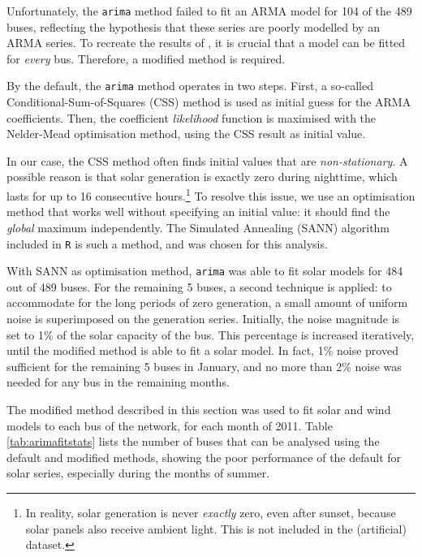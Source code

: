 \documentclass[main.tex]{subfiles}
\begin{document}
Unfortunately, the \texttt{arima} method failed to fit an ARMA model for 104 of the 489 buses, reflecting the hypothesis that these series are poorly modelled by an ARMA series. To recreate the results of \cite{Nesti2018emergentfailures}, it is crucial that a model can be fitted for \emph{every} bus. Therefore, a modified method is required.

By the default, the \texttt{arima} method operates in two steps. First, a so-called Conditional-Sum-of-Squares (CSS) method is used as initial guess for the ARMA coefficients. Then, the coefficient \emph{likelihood} function is maximised with the Nelder-Mead optimisation method, using the CSS result as initial value. 

In our case, the CSS method often finds initial values that are \emph{non-stationary}. A possible reason is that solar generation is exactly zero during nighttime, which lasts for up to 16 consecutive hours.\footnote{In reality, solar generation is never \emph{exactly} zero, even after sunset, because solar panels also receive ambient light. This is not included in the (artificial) dataset.
}
To resolve this issue, we use an optimisation method that works well without specifying an initial value: it should find the \emph{global} maximum independently. The Simulated Annealing (SANN) algorithm included in \texttt{R} is such a method, and was chosen for this analysis. 

With SANN as optimisation method, \texttt{arima} was able to fit solar models for 484 out of 489 buses. For the remaining 5 buses, a second technique is applied: to accommodate for the long periods of zero generation, a small amount of uniform noise is superimposed on the generation series. Initially, the noise magnitude is set to 1\% of the solar capacity of the bus. This percentage is increased iteratively, until the modified method is able to fit a solar model. In fact, 1\% noise proved sufficient for the remaining 5 buses in January, and no more than 2\% noise was needed for any bus in the remaining months. 

The modified method described in this section was used to fit solar and wind models to each bus of the network, for each month of 2011. Table \ref{tab:arimafitstats} lists the number of buses that can be analysed using the default and modified methods, showing the poor performance of the default for solar series, especially during the months of summer.
\end{document}
